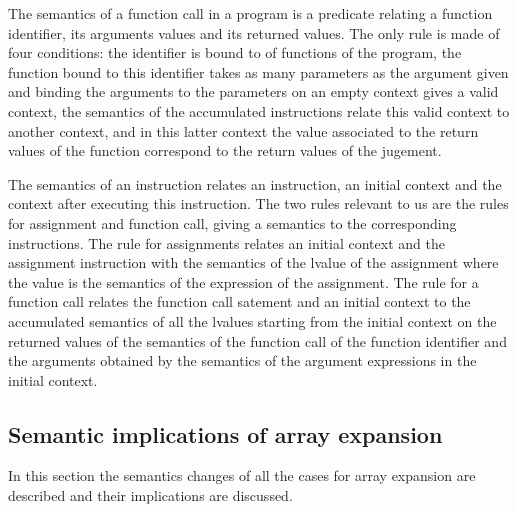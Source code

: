 \documentclass{article}
\begin{document}
The semantics of a function call in a program is a predicate relating a function
identifier, its arguments values and its returned values. The only rule is made
of four conditions: the identifier is bound to of functions of the program, the
function bound to this identifier takes as many parameters as the argument given
and binding the arguments to the parameters on an empty context gives a valid
context, the semantics of the accumulated instructions relate this valid context
to another context, and in this latter context the value associated to the
return values of the function correspond to the return values of the jugement.

\smallskip

The semantics of an instruction relates an instruction, an initial context and the
context after executing this instruction. The two rules relevant to us are the
rules for assignment and function call, giving a semantics to the corresponding
instructions. The rule for assignments relates an initial context and the assignment
instruction with the semantics of the lvalue of the assignment where the
value is the semantics of the expression of the assignment. The rule for a
function call relates the function call satement and an initial context to the
accumulated semantics of all the lvalues starting from the initial context
on the returned values of the semantics of the function call of the function
identifier and the arguments obtained by the semantics of the argument
expressions in the initial context.


\subsection{Semantic implications of array expansion}

In this section the semantics changes of all the cases for array expansion are
described and their implications are discussed.
\end{document}
